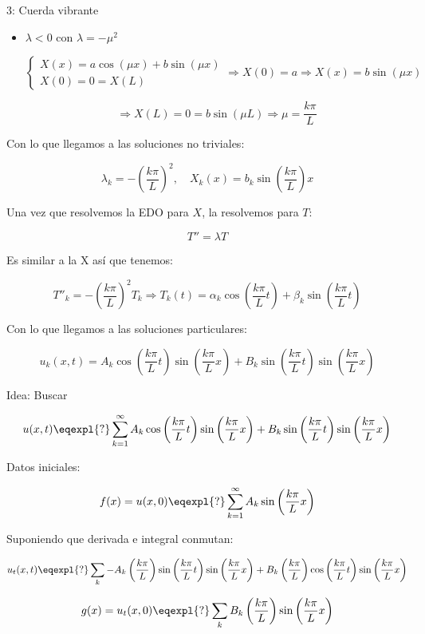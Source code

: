 \begin{example}{3: Cuerda vibrante}
\begin{itemize}
				\item $\lambda < 0$ con $\lambda = -\mu^2$

					\[
					\left\{
					\begin{array}{l}
					X(x) = a\cos(\mu x) + b\sin(\mu x) \\
					X(0) = 0 = X(L)
					\end{array}
					\right.
					\Rightarrow X(0) = a \Rightarrow X(x) = b \sin(\mu x)
					\]

					\[ \Rightarrow X(L) = 0 = b \sin (\mu L) \Rightarrow \mu = \frac{k \pi}{L}\]

			\end{itemize}

			Con lo que llegamos a las soluciones no triviales:

			\[\lambda_k = - (\frac{k\pi}{L})^2, \quad X_k(x) = b_k \sin \left(\frac{k\pi}{L} \right) x\]


			Una vez que resolvemos la EDO para $X$, la resolvemos para $T$:

			\[T'' = \lambda T\]

			Es similar a la X así que tenemos:

			\[T''_k = - (\frac{k\pi}{L})^2 T_k \Rightarrow T_k (t) = \alpha_k \cos\left( \frac{k \pi}{L} t \right) + \beta_k \sin \left( \frac{k \pi}{L}t \right)\]

			Con lo que llegamos a las soluciones particulares:

			\[u_k(x,t) = A_k \cos \left(\frac{k\pi}{L} t\right) \sin \left(\frac{k\pi}{L}x\right) + B_k \sin \left(\frac{k\pi}{L}t\right)  \sin \left(\frac{k\pi}{L}x\right) \]

			Idea: Buscar

			\[u(x,t) \eqexpl{?} \sum_{k=1}^{\infty} A_k \cos \left(\frac{k\pi}{L} t\right) \sin \left(\frac{k\pi}{L} x  \right)+ B_k \sin \left(\frac{k\pi}{L}t \right) \sin \left(\frac{k\pi}{L}  x \right)\]

			Datos iniciales:

			\[ f(x) = u(x,0) \eqexpl{?} \sum^{\infty}_{k=1} A_k \sin \left(\frac{k\pi}{L} x  \right)\]

			Suponiendo que derivada e integral conmutan:

			\[ u_t (x,t) \eqexpl{?} \sum_{k} - A_k \left(\frac{k\pi}{L} \right) \sin \left(\frac{k\pi}{L}t \right) \sin \left(\frac{k\pi}{L}x \right) + B_k \left(\frac{k\pi}{L} \right) \cos \left(\frac{k\pi}{L}t \right) \sin \left(\frac{k\pi}{L}x \right)
			\]

			\[g(x) = u_t(x,0) \eqexpl{?} \sum_k B_k  \left(\frac{k\pi}{L} \right) \sin \left(\frac{k\pi}{L}x \right)\]

		\end{example}


